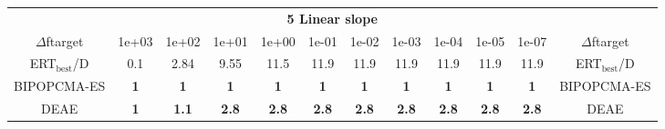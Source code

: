 \begin{tabular}{cccccccccccc}
 & \multicolumn{10}{c}{{\normalsize \textbf{5 Linear slope}}}\\
$\Delta$ftarget& 1e+03& 1e+02& 1e+01& 1e+00& 1e-01& 1e-02& 1e-03& 1e-04& 1e-05& 1e-07 & $\Delta$ftarget \\
ERT$_{\textrm{best}}$/D& 0.1& 2.84& 9.55& 11.5& 11.9& 11.9& 11.9& 11.9& 11.9& 11.9 & ERT$_{\textrm{best}}$/D \\
\hline
BIPOPCMA-ES & \textbf{1} & \textbf{1} & \textbf{1} & \textbf{1} & \textbf{1} & \textbf{1} & \textbf{1} & \textbf{1} & \textbf{1} & \textbf{1} & BIPOPCMA-ES \cite{add_an_entry_for_BIPOPCMA-ES_in_bbob.bib}\\
DEAE & \textbf{1} & \textbf{1.1} & \textbf{2.8} & \textbf{2.8} & \textbf{2.8} & \textbf{2.8} & \textbf{2.8} & \textbf{2.8} & \textbf{2.8} & \textbf{2.8} & DEAE \cite{add_an_entry_for_DEAE_in_bbob.bib}
\end{tabular}
